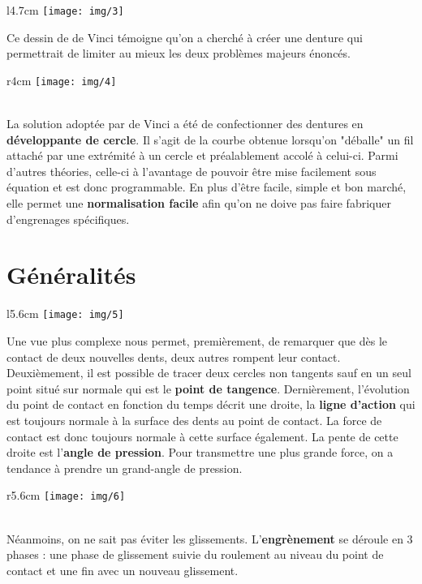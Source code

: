\newpage	
	
	\begin{wrapfigure}[4]{l}{4.7cm}
	\vspace{-1mm}
	\texttt{[image: img/3]}
	\end{wrapfigure}	
	\noindent Ce dessin de de Vinci témoigne qu'on a cherché à créer une denture qui permettrait de limiter au mieux les deux problèmes majeurs énoncés. \\
	
	\begin{wrapfigure}[9]{r}{4cm}
	\texttt{[image: img/4]}
	\end{wrapfigure}	
	\ \\ La solution adoptée par de Vinci a été de confectionner des dentures en \textbf{développante de cercle}. Il s'agit de la courbe obtenue lorsqu'on "déballe" un fil attaché par une extrémité à un cercle et préalablement accolé à celui-ci. Parmi d'autres théories, celle-ci à l'avantage de pouvoir être mise facilement sous équation et est donc programmable. En plus d'être facile, simple et bon marché, elle permet une \textbf{normalisation facile} afin qu'on ne doive pas faire fabriquer d'engrenages spécifiques. 
	
\section{Généralités}
	\begin{wrapfigure}[7]{l}{5.6cm}
	\vspace{-5mm}
	\texttt{[image: img/5]}
	\end{wrapfigure}	
	\noindent Une vue plus complexe nous permet, premièrement, de remarquer que dès le contact de deux nouvelles dents, deux autres rompent leur contact. Deuxièmement, il est possible de tracer deux cercles non tangents sauf en un seul point situé sur normale qui est le \textbf{point de tangence}. Dernièrement, l'évolution du point de contact en fonction du temps décrit une droite, la \textbf{ligne d'action} qui est toujours normale à la surface des dents au point de contact. La force de contact est donc toujours normale à cette surface également. La pente de cette droite est l'\textbf{angle de pression}. Pour transmettre une plus grande force, on a tendance à prendre un grand-angle de pression. 
	
	\begin{wrapfigure}[5]{r}{5.6cm}
	\texttt{[image: img/6]}
	\end{wrapfigure}	
	\ \\ Néanmoins, on ne sait pas éviter les glissements. L'\textbf{engrènement} se déroule en 3 phases : une phase de glissement suivie du roulement au niveau du point de contact et une fin avec un nouveau glissement. 

